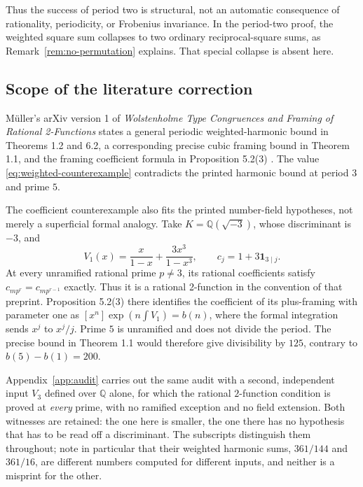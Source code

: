 \documentclass[11pt,a4paper]{article}
\numberwithin{equation}{section}
\theoremstyle{definition}
\theoremstyle{remark}
\newcommand{\Q}{\mathbb Q}
\begin{document}
Thus the success of period two is structural, not an automatic consequence
of rationality, periodicity, or Frobenius invariance. In the period-two
proof, the weighted square sum collapses to two ordinary reciprocal-square
sums, as Remark~\ref{rem:no-permutation} explains. That special collapse is
absent here.

\subsection{Scope of the literature correction}
\label{sec:litscope}
M\"uller's arXiv version 1 of \emph{Wolstenholme Type Congruences and Framing
of Rational 2-Functions} states a general periodic weighted-harmonic bound
in Theorems 1.2 and 6.2, a corresponding precise cubic framing bound in
Theorem 1.1, and the framing coefficient formula in Proposition 5.2(3)
\cite{muller}. The value \eqref{eq:weighted-counterexample}
contradicts the printed harmonic bound at period $3$ and prime $5$.

The coefficient counterexample also fits the printed number-field
hypotheses, not merely a superficial formal analogy. Take
$K=\Q(\sqrt{-3})$, whose discriminant is $-3$, and
\begin{equation}\label{eq:V1-input}
 V_1(x)=\frac{x}{1-x}+\frac{3x^3}{1-x^3},
 \qquad c_j=1+3\mathbf1_{3\mid j}.
\end{equation}
At every unramified rational prime $p\ne3$, its rational coefficients
satisfy $c_{mp^r}=c_{mp^{r-1}}$ exactly. Thus it is a rational 2-function
in the convention of that preprint. Proposition 5.2(3) there identifies the
coefficient of its plus-framing with parameter one as
$[x^n]\exp(n\int V_1)=b(n)$, where the formal integration sends $x^j$ to
$x^j/j$. Prime $5$ is unramified and does not divide the period. The
precise bound in Theorem 1.1 would therefore give divisibility by $125$,
contrary to $b(5)-b(1)=200$.

Appendix~\ref{app:audit} carries out the same audit with a second,
independent input $V_3$ defined over $\Q$ alone, for which the rational
$2$-function condition is proved at \emph{every} prime, with no ramified
exception and no field extension. Both witnesses are retained: the one here
is smaller, the one there has no hypothesis that has to be read off a
discriminant. The subscripts distinguish them throughout; note in particular
that their weighted harmonic sums, $361/144$ and $361/16$, are different
numbers computed for different inputs, and neither is a misprint for the
other.
\end{document}
